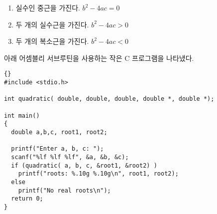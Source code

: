 \begin{enumerate}
\item 실수인 중근을 가진다. $b^2 - 4 a c = 0$
\item 두 개의 실수근을 가진다. $b^2 - 4 a c > 0$
\item 두 개의 복소근을 가진다. $b^2 - 4 a c < 0$
\end{enumerate}

아래 어셈블리 서브루틴을 사용하는 작은 C 프로그램을 나타냈다. 

\begin{lstlisting}{}
#include <stdio.h>

int quadratic( double, double, double, double *, double *);

int main()
{
  double a,b,c, root1, root2;

  printf("Enter a, b, c: ");
  scanf("%lf %lf %lf", &a, &b, &c);
  if (quadratic( a, b, c, &root1, &root2) )
    printf("roots: %.10g %.10g\n", root1, root2);
  else
    printf("No real roots\n");
  return 0;
}
\end{lstlisting}

